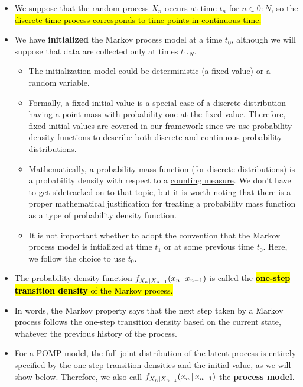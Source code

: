\documentclass[]{article}
\begin{document}
\begin{itemize}
\item
  We suppose that the random process \(X_n\) occurs at time \(t_n\) for
  \(n\in 0:N\), so the \hl{discrete time process corresponds to time points
  in continuous time.}
\item
  We have \textbf{initialized} the Markov process model at a time
  \(t_0\), although we will suppose that data are collected only at
  times \(t_{1:N}\).

  \begin{itemize}
  \item
    The initialization model could be deterministic (a fixed value) or a
    random variable.
  \item
    Formally, a fixed initial value is a special case of a discrete
    distribution having a point mass with probability one at the fixed
    value. Therefore, fixed initial values are covered in our framework
    since we use probability density functions to describe both discrete
    and continuous probability distributions.
  \item
    Mathematically, a probability mass function (for discrete
    distributions) is a probability density with respect to a
    \href{https://en.wikipedia.org/wiki/Counting_measure}{counting
    measure}. We don't have to get sidetracked on to that topic, but it
    is worth noting that there is a proper mathematical justification
    for treating a probability mass function as a type of probability
    density function.
  \item
    It is not important whether to adopt the convention that the Markov
    process model is intialized at time \(t_1\) or at some previous time
    \(t_0\). Here, we follow the choice to use \(t_0\).
  \end{itemize}
\item
  The probability density function
  \(f_{X_n|X_{n-1}}(x_n{\, | \,} x_{n-1})\) is called the \hl{\textbf{one-step
  transition density} of the Markov process.}
\item
  In words, the Markov property says that the next step taken by a
  Markov process follows the one-step transition density based on the
  current state, whatever the previous history of the process.
\item
  For a POMP model, the full joint distribution of the latent process is
  entirely specified by the one-step transition densities and the initial value, as we will
  show below. Therefore, we also call
  \(f_{X_n|X_{n-1}}(x_n{\, | \,} x_{n-1})\) the \textbf{process model}.
\end{itemize}
\end{document}
